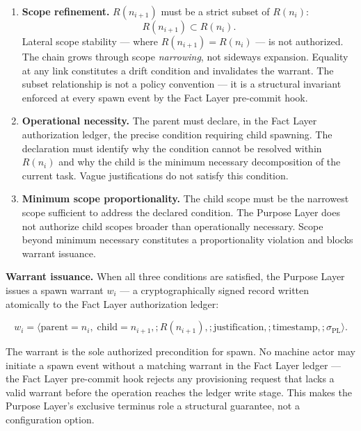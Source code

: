 \begin{enumerate}
    \item[(P1)] \textbf{Scope refinement.} $R(n_{i+1})$ must be a strict subset of $R(n_i)$:
    \begin{equation}
    R(n_{i+1}) \subset R(n_i).
    \label{eq:rs-scope-refinement}
    \end{equation}
    Lateral scope stability --- where $R(n_{i+1}) = R(n_i)$ --- is not authorized. The chain grows through scope \emph{narrowing}, not sideways expansion. Equality at any link constitutes a drift condition and invalidates the warrant. The subset relationship is not a policy convention --- it is a structural invariant enforced at every spawn event by the Fact Layer pre-commit hook.

    \item[(P2)] \textbf{Operational necessity.} The parent must declare, in the Fact Layer authorization ledger, the precise condition requiring child spawning. The declaration must identify why the condition cannot be resolved within $R(n_i)$ and why the child is the minimum necessary decomposition of the current task. Vague justifications do not satisfy this condition.

    \item[(P3)] \textbf{Minimum scope proportionality.} The child scope must be the narrowest scope sufficient to address the declared condition. The Purpose Layer does not authorize child scopes broader than operationally necessary. Scope beyond minimum necessary constitutes a proportionality violation and blocks warrant issuance.
\end{enumerate}

\medskip
\noindent\textbf{Warrant issuance.} When all three conditions are satisfied, the Purpose Layer issues a spawn warrant $w_i$ --- a cryptographically signed record written atomically to the Fact Layer authorization ledger:

\begin{equation}
w_i = \bigl\langle
\text{parent}=n_i,\;
\text{child}=n_{i+1},;
R(n_{i+1}),;
\text{justification},;
\text{timestamp},;
\sigma_{\text{PL}}
\bigr\rangle .
\label{eq:spawn-warrant}
\end{equation}

The warrant is the sole authorized precondition for spawn. No machine actor may initiate a spawn event without a matching warrant in the Fact Layer ledger --- the Fact Layer pre-commit hook rejects any provisioning request that lacks a valid warrant before the operation reaches the ledger write stage. This makes the Purpose Layer's exclusive terminus role a structural guarantee, not a configuration option.

